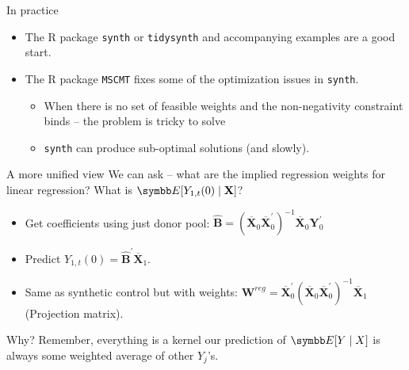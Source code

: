 \documentclass[aspectratio=169,11pt]{beamer}
\begin{document}
\begin{frame}{In practice}
\begin{itemize}
\item The R package \texttt{synth} or \texttt{tidysynth} and accompanying examples are a good start.
\item The R package \texttt{MSCMT} fixes some of the optimization issues in \texttt{synth}.
\begin{itemize}
\item When there is no set of feasible weights and the non-negativity constraint binds -- the problem is tricky to solve
\item \texttt{synth} can produce sub-optimal solutions (and slowly).
\end{itemize}

\end{itemize}

\end{frame}


\begin{frame}{A more unified view}
We can ask -- what are the implied regression weights for linear regression? What is $\E[Y_{1,t}(0) \mid \mathbf{X}]$?
\begin{itemize}
\item Get coefficients using just donor pool: $\widehat{\boldsymbol{B}}=\left(\overline{\boldsymbol{X}}_{0} \overline{\boldsymbol{X}}_{0}^{\prime}\right)^{-1} \overline{\boldsymbol{X}}_{0} \boldsymbol{Y}_{0}^{\prime}$
\item Predict $Y_{1,t}(0) = \widehat{\boldsymbol{B}}^{\prime} \overline{\boldsymbol{X}}_{1}$.
\item Same as synthetic control but with weights: $\boldsymbol{W}^{r e g}=\overline{\boldsymbol{X}}_{0}^{\prime}\left(\overline{\boldsymbol{X}}_{0} \overline{\boldsymbol{X}}_{0}^{\prime}\right)^{-1} \overline{\boldsymbol{X}}_{1}$ (Projection matrix).
\end{itemize}
Why? Remember, \alert{everything is a kernel} our prediction of $\E[Y \mid X]$ is always some weighted average of other $Y_j$'s.
\end{frame}
\end{document}

